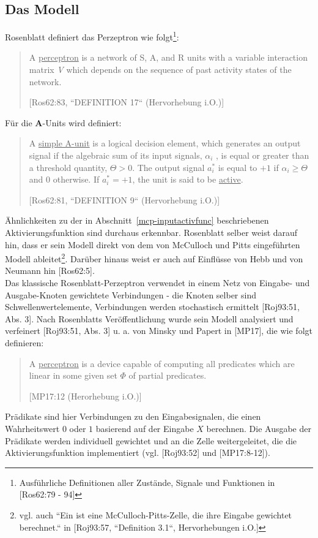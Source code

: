\subsection{Das Modell}

Rosenblatt definiert das Perzeptron wie folgt\footnote{
    Ausführliche Definitionen aller Zustände, Signale und Funktionen in [Ros62:79 - 94]
}:

\blockquote[{[Ros62:83, ``DEFINITION 17`` (Hervorhebung i.O.)]}]{
    A \underline{perceptron} is a network of S, A, and R units with a variable interaction matrix \textit{V} which depends on the
    sequence of past activity states of the network.
}

Für die \textbf{A}-Units wird definiert:

\blockquote[{[Ros62:81, ``DEFINITION 9`` (Hervorhebung i.O.)]}]{
    A \underline{simple A-unit} is a logical decision element, which
    generates an output signal if the algebraic sum of its
    input signals, $\alpha_i$ , is equal or greater than a threshold
    quantity, $\Theta > 0$. The output signal $a^*_i$ is equal to $+1$ if $\alpha_i \geq \Theta$ and $0$ otherwise. If $a^*_i = +1$,
    the unit is said to be \underline{active}.
}


Ähnlichkeiten zu der in Abschnitt~\ref{mcp-inputactivfunc} beschriebenen Aktivierungsfunktion sind durchaus erkennbar.
Rosenblatt selber weist darauf hin, dass er sein Modell direkt von dem von McCulloch und Pitts eingeführten Modell ableitet\footnote{
    vgl. auch ``Ein  ist eine McCulloch-Pitts-Zelle, die ihre Eingabe gewichtet berechnet.`` in [Roj93:57, ``Definition 3.1``, Hervorhebungen i.O.]
}. Darüber hinaus weist er auch auf Einflüsse von Hebb und von Neumann hin [Ros62:5].\\


Das klassische Rosenblatt-Perzeptron verwendet in einem Netz von Eingabe- und Ausgabe-Knoten gewichtete Verbindungen - die Knoten selber sind Schwellenwertelemente, Verbindungen werden stochastisch ermittelt [Roj93:51, Abs. 3].
Nach Rosenblatts Veröffentlichung wurde sein Modell analysiert und verfeinert [Roj93:51, Abs. 3] u. a. von Minsky und Papert in [MP17], die wie folgt definieren:

\blockquote[{[MP17:12 (Herorhebung i.O.)]}]{
    A \underline{perceptron} is a device capable of computing all predicates which are linear in some given set $\Phi$ of partial predicates.
}

Prädikate sind hier Verbindungen zu den Eingabesignalen, die einen Wahrheitswert $0$ oder $1$ basierend auf der Eingabe $X$ berechnen.
Die Ausgabe der Prädikate werden individuell gewichtet und an die Zelle weitergeleitet, die die Aktivierungsfunktion implementiert (vgl. [Roj93:52] und [MP17:8-12]).


